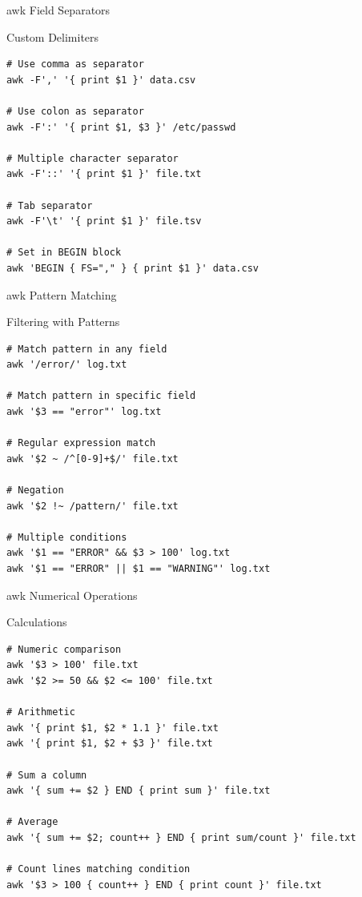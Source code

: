 \documentclass[presentation,aspectratio=1610]{beamer}
\begin{document}
\begin{frame}[label={sec:orgf7de3de},fragile]{awk Field Separators}
 \begin{block}{Custom Delimiters}
\begin{verbatim}
# Use comma as separator
awk -F',' '{ print $1 }' data.csv

# Use colon as separator
awk -F':' '{ print $1, $3 }' /etc/passwd

# Multiple character separator
awk -F'::' '{ print $1 }' file.txt

# Tab separator
awk -F'\t' '{ print $1 }' file.tsv

# Set in BEGIN block
awk 'BEGIN { FS="," } { print $1 }' data.csv
\end{verbatim}
\end{block}
\end{frame}
\begin{frame}[label={sec:org101d303},fragile]{awk Pattern Matching}
 \begin{block}{Filtering with Patterns}
\begin{verbatim}
# Match pattern in any field
awk '/error/' log.txt

# Match pattern in specific field
awk '$3 == "error"' log.txt

# Regular expression match
awk '$2 ~ /^[0-9]+$/' file.txt

# Negation
awk '$2 !~ /pattern/' file.txt

# Multiple conditions
awk '$1 == "ERROR" && $3 > 100' log.txt
awk '$1 == "ERROR" || $1 == "WARNING"' log.txt
\end{verbatim}
\end{block}
\end{frame}
\begin{frame}[label={sec:org427e1c8},fragile]{awk Numerical Operations}
 \begin{block}{Calculations}
\begin{verbatim}
# Numeric comparison
awk '$3 > 100' file.txt
awk '$2 >= 50 && $2 <= 100' file.txt

# Arithmetic
awk '{ print $1, $2 * 1.1 }' file.txt
awk '{ print $1, $2 + $3 }' file.txt

# Sum a column
awk '{ sum += $2 } END { print sum }' file.txt

# Average
awk '{ sum += $2; count++ } END { print sum/count }' file.txt

# Count lines matching condition
awk '$3 > 100 { count++ } END { print count }' file.txt
\end{verbatim}
\end{block}
\end{frame}
\end{document}

